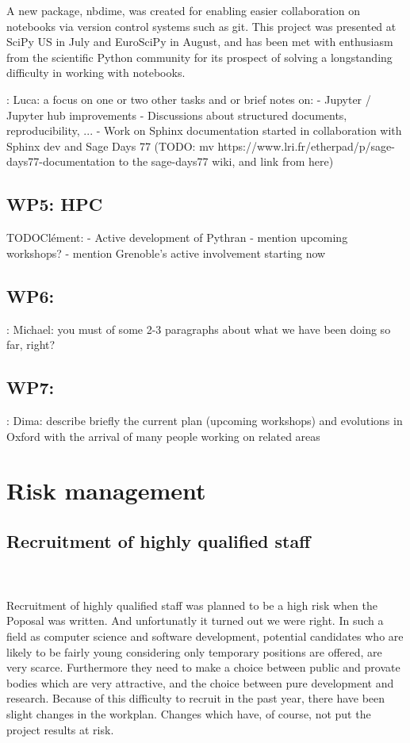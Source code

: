 \documentclass{deliverablereport}
\newcommand{\TODO}[1]{{\color{red}{TODO}: #1}}
\begin{document}
A new \Jupyter package, nbdime, was created for 
enabling easier collaboration on notebooks via version control systems such as git.
This project was presented at SciPy US in July and EuroSciPy in August,
and has been met with enthusiasm from the scientific Python community
for its prospect of solving a longstanding difficulty in working with notebooks.

\TODO{Luca: a focus on one or two other tasks and or brief notes on:
- Jupyter / Jupyter hub improvements
- Discussions about structured documents, reproducibility, ...
- Work on Sphinx documentation started in collaboration with Sphinx
  dev and Sage Days 77 (TODO: mv
  https://www.lri.fr/etherpad/p/sage-days77-documentation to the
  sage-days77 wiki, and link from here)
}
\subsection{WP5: HPC}

TODO{Clément:
- Active development of Pythran
- mention upcoming workshops?
- mention Grenoble's active involvement starting now}

\subsection{WP6: }

\TODO{Michael: you must of some 2-3 paragraphs about what we have
been doing so far, right?}

\subsection{WP7: }

\TODO{Dima: describe briefly the current plan (upcoming workshops)
and evolutions in Oxford with the arrival of many people working on
related areas}

\section{Risk management}
\subsection{Recruitment of highly qualified staff}
 ~\\~\\Recruitment of highly qualified staff was planned to be a high risk when the Poposal was written. And unfortunatly it turned out we were right. In such a field as computer science and software development, potential candidates who are likely to be fairly young considering only temporary positions are offered, are very scarce. Furthermore they need to make a choice between public and provate bodies which are very attractive, and the choice between pure development and research.
Because of this difficulty to recruit in the past year, there have been slight changes in the workplan. Changes which have, of course, not put the project results at risk.
\end{document}
